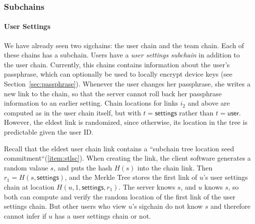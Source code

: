 \subsubsection{Subchains}
\label{sec:subchains}

\newcommand{\user}{\textsf{user}}
\newcommand{\settings}{\textsf{settings}}
\newcommand{\teamMembership}{\textsf{teamMembership}}

\paragraph{User Settings}
We have already seen two sigchains: the user chain and the team chain. Each of
these chains has a subchain. Users have a \textit{user settings subchain} in
addition to the user chain. Currently, this chains contains information about
the user's passphrase, which can optionally be used to locally encrypt device
keys (see Section~\ref{sec:passphrase}). Whenever the user changes her
passphrase, she writes a new link to the chain, so that the server cannot roll
back her passphrase information to an earlier setting.  Chain locations for
links $i_2$ and above are computed as in the user chain itself, but with $t =
\settings$ rather than $t = \user$.  However, the eldest link is randomized,
since otherwise, its location in the tree is predictable given the user ID.

Recall that the eldest user chain link contains a ``subchain tree location seed
commitment``(\ref{item:stlsc}). When creating the link, the client software
generates a random valaue $s$, and puts the hash $H(s)$ into the chain link.
Then $r_1 = H(s, \settings)$, and the Merkle Tree stores the first link of 
$u$'s user settings chain at location $H(u, 1, \settings, r_1)$. The server knows 
$s$, and $u$ knows $s$, so both can compute and verify the random location of 
the first link of the user settings chain. But other users who view $u$'s
sigchain do not know $s$ and therefore cannot infer if $u$ has a user
settings chain or not.

